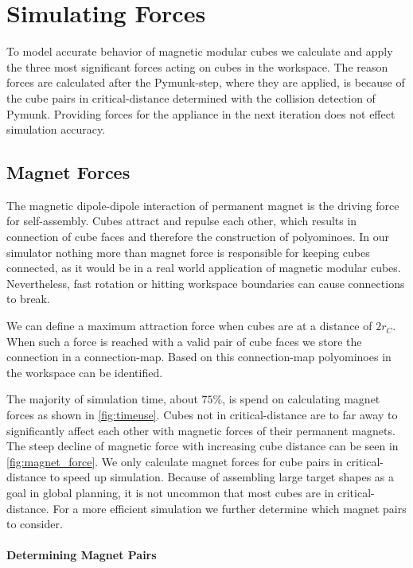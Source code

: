 \section{Simulating Forces}

To model accurate behavior of magnetic modular cubes we calculate and apply the three most significant forces acting on cubes in the workspace.
The reason forces are calculated after the Pymunk-step, where they are applied, is because of the cube pairs in critical-distance determined with the collision detection of Pymunk.
Providing forces for the appliance in the next iteration does not effect simulation accuracy.

\subsection{Magnet Forces}
\label{sec:force_magnet}

The magnetic dipole-dipole interaction of permanent magnet is the driving force for self-assembly.
Cubes attract and repulse each other, which results in connection of cube faces and therefore the construction of polyominoes.
In our simulator nothing more than magnet force is responsible for keeping cubes connected, as it would be in a real world application of magnetic modular cubes.
Nevertheless, fast rotation or hitting workspace boundaries can cause connections to break.

We can define a maximum attraction force when cubes are at a distance of $2 r_C$.
When such a force is reached with a valid pair of cube faces we store the connection in a connection-map.
Based on this connection-map polyominoes in the workspace can be identified.

The majority of simulation time, about $75\%$, is spend on calculating magnet forces as shown in \autoref{fig:timeuse}.
Cubes not in critical-distance are to far away to significantly affect each other with magnetic forces of their permanent magnets.
The steep decline of magnetic force with increasing cube distance can be seen in \autoref{fig:magnet_force}.
We only calculate magnet forces for cube pairs in critical-distance to speed up simulation.
Because of assembling large target shapes as a goal in global planning, it is not uncommon that most cubes are in critical-distance.
For a more efficient simulation we further determine which magnet pairs to consider.

\paragraph{Determining Magnet Pairs}

